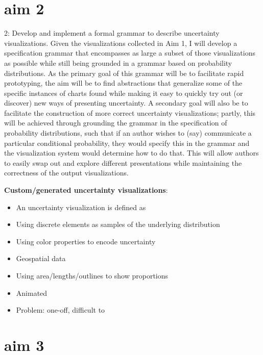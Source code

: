 \documentclass[11pt]{article}
\begin{document}
\section{aim 2}

2: Develop and implement a formal grammar to describe uncertainty visualizations. Given the visualizations collected in Aim 1, I will develop a specification grammar that encompasses as large a subset of those visualizations as possible while still being grounded in a grammar based on probability distributions. As the primary goal of this grammar will be to facilitate rapid prototyping, the aim will be to find abstractions that generalize some of the specific instances of charts found while making it easy to quickly try out (or discover) new ways of presenting uncertainty. A secondary goal will also be to facilitate the construction of more correct uncertainty visualizations; partly, this will be achieved through grounding the grammar in the specification of probability distributions, such that if an author wishes to (say) communicate a particular conditional probability, they would specify this in the grammar and the visualization system would determine how to do that. This will allow authors to easily swap out and explore different presentations while maintaining the correctness of the output visualizations.



\noindent \textbf{Custom/generated uncertainty visualizations}:



\begin{itemize}
    \item An uncertainty visualization is defined as 
    \item Using discrete elements as samples of the underlying distribution \cite{kay2016bus, park2016gatherplots, Park2017}
    \item Using color properties to encode uncertainty \cite{lucchesi_visualizing_2017, Correll2018}
    \item Geospatial data \cite{lucchesi_visualizing_2017, liu2018visualizing}
    \item Using area/lengths/outlines to show proportions \cite{wickham_product_2011, Gortler2018}
    \item Animated \cite{hullman2015hops}
    \item Problem: one-off, difficult to 
\end{itemize}


\section{aim 3}
\end{document}
